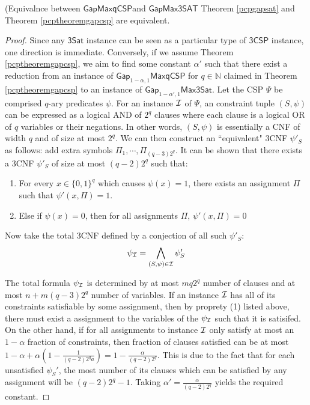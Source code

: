\begin{lemma} (Equivalnce between $\mathsf{GapMaxqCSP}$and $\mathsf{GapMax3SAT}$ Theorem \ref{pcpgapsat} and Theorem \ref{pcptheoremgapcsp} are equivalent.
\end{lemma}
%
\begin{proof}
Since any $\mathsf{3Sat}$ instance can be seen as a particular type of $\mathsf{3CSP}$ instance, one direction is immediate. Conversely, if we assume Theorem \ref{pcptheoremgapcsp}, we aim to find some constant $\alpha'$ such that there exist a reduction from an instance of $\mathsf{Gap}_{1-\alpha,1}\mathsf{MaxqCSP}$ for $q \in \mathbb{N}$ claimed in Theorem \ref{pcptheoremgapcsp} to an instance of $\mathsf{Gap}_{1-\alpha',1}\mathsf{Max3Sat}$.
%
Let the CSP $\Psi$ be comprised $q$-ary predicates $\psi$. For an instance $\mathcal{I}$ of $\Psi$, an constraint tuple $(S,\psi)$ can be expressed as a logical AND of $2^q$ clauses where each clause is a logical OR of $q$ variables or their negations. In other words, $(S,\psi)$ is essentially a CNF of width $q$ and of size at most $2^q$. We can then construct an ``equivalent" 3CNF $\psi'_S$ as follows: add extra symbols $\Pi_{1}, \cdots, \Pi_{(q-3)2^{q}}$. It can be shown that there exists a 3CNF $\psi'_S$ of size at most $(q-2)2^{q}$ such that:

\begin{enumerate}
  \item For every $x \in \{0,1\}^q$ which causes $\psi(x) = 1$, there exists an assignment $\Pi$ such that $\psi'(x,\Pi) = 1$.
  \item Else if $\psi(x) = 0$, then for all assignments $\Pi$, $\psi'(x,\Pi) = 0$
\end{enumerate}

Now take the total 3CNF defined by a conjection of all such $\psi'_S$:
\[ \psi_{\mathcal{I}} = \bigwedge_{(S,\psi) \in \mathcal{I}}  \psi_S' \]

The total formula $\psi_{\mathcal{I}}$ is determined by at most $mq2^q$ number of clauses and at most $n + m(q-3)2^q$ number of variables.
%
If an instance $\mathcal{I}$ has all of its constraints satisfiable by some assignment, then by proprety (1) listed above, there must exist a assignment to the variables of the $\psi_{\mathcal{I}}$ such that it is satisifed.
%
On the other hand, if for all assignments to instance $\mathcal{I}$ only satisfy at most an $1 - \alpha$ fraction of constraints, then fraction of clauses satisfied can be at most $1 - \alpha + \alpha(1 - \frac{1}{(q-2)2^qa}) = 1 - \frac{\alpha}{(q-2)2^q}$. This is due to the fact that for each unsatisfied $\psi_S'$, the most number of its clauses which can be satisfied by any assignment will be $(q-2)2^q - 1$. Taking $\alpha' = \frac{\alpha}{(q-2)2^q}$
yields the required constant.
\end{proof}

